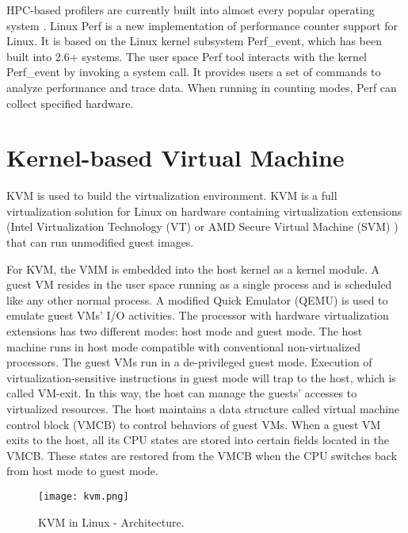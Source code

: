 \documentclass[12pt]{report}
\begin{document}
HPC-based profilers are currently built into almost every
popular operating system . Linux Perf  is a new
implementation of performance counter support for Linux. It
is based on the Linux kernel subsystem Perf\_event, which
has been built into 2.6+ systems. The user space Perf tool
interacts with the kernel Perf\_event by invoking a system call.
It provides users a set of commands to analyze performance
and trace data. When running in counting modes, Perf can
collect specified hardware.

\section{Kernel-based Virtual Machine}
 KVM is used to build the virtualization environment. KVM
is a full virtualization solution for Linux on hardware containing
virtualization extensions (Intel Virtualization Technology
(VT)  or AMD Secure Virtual Machine (SVM) ) that
can run unmodified guest images.

For KVM, the VMM is embedded into the host kernel as a
kernel module. A guest VM resides in the user space running
as a single process and is scheduled like any other normal
process. A modified Quick Emulator (QEMU)  is used to
emulate guest VMs’ I/O activities. The processor with hardware
virtualization extensions has two different modes: host
mode and guest mode. The host machine runs in host mode
compatible with conventional non-virtualized processors. The
guest VMs run in a de-privileged guest mode. Execution of
virtualization-sensitive instructions in guest mode will trap to
the host, which is called VM-exit. In this way, the host can
manage the guests’ accesses to virtualized resources. The host
maintains a data structure called virtual machine control block
(VMCB) to control behaviors of guest VMs. When a guest
VM exits to the host, all its CPU states are stored into certain
fields located in the VMCB. These states are restored from
the VMCB when the CPU switches back from host mode to
guest mode.

\begin{figure}[h]
\centering
\texttt{[image: kvm.png]}
\caption{KVM in Linux - Architecture.}
\end{figure}
\end{document}
